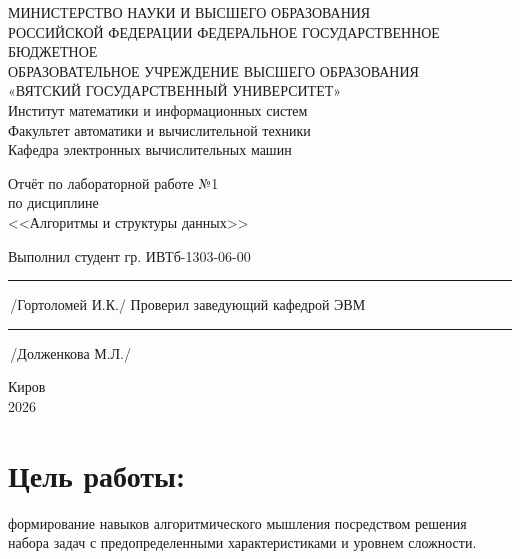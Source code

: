 \documentclass[oneside,a4paper,14pt]{extarticle} %
\begin{document}
	\newpage\thispagestyle{empty}
	\begin{center}
		МИНИСТЕРСТВО НАУКИ И ВЫСШЕГО ОБРАЗОВАНИЯ\\
			РОССИЙСКОЙ ФЕДЕРАЦИИ
			ФЕДЕРАЛЬНОЕ ГОСУДАРСТВЕННОЕ БЮДЖЕТНОЕ\\
			ОБРАЗОВАТЕЛЬНОЕ
			УЧРЕЖДЕНИЕ ВЫСШЕГО ОБРАЗОВАНИЯ\\
			«ВЯТСКИЙ ГОСУДАРСТВЕННЫЙ УНИВЕРСИТЕТ»\\
			Институт математики и информационных систем\\
			Факультет автоматики и вычислительной техники\\
			Кафедра электронных вычислительных машин
	\end{center}
	\vspace{20mm}

	\begin{center}
		Отчёт по лабораторной работе №1\\
		по дисциплине\\
		<<Алгоритмы и структуры данных>>\\
	\end{center}
	\vspace{48mm}

	\noindent
	Выполнил студент гр. ИВТб-1303-06-00 \hfill \rule[-0,5mm]{30mm}{0.15mm}\,/Гортоломей И.К./
	\newline
	Проверил заведующий кафедрой ЭВМ \hfill \rule[-0,5mm]{30mm}{0.15mm}\,/Долженкова М.Л./

	\vfill
	\begin{center}
		Киров\\
		2026
	\end{center}

	\newpage
	\thispagestyle{empty}

	\section*{Цель работы:} формирование навыков алгоритмического мышления посредством решения набора задач с предопределенными характеристиками и уровнем сложности.
\end{document}
